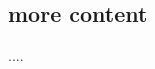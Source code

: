 \documentclass[aps,pre,preprint,nofootinbib]{revtex4}
\begin{document}
\subsection{more content}

....


\begin{acknowledgments}
\end{acknowledgments}


\appendix*
\section{}

%
%
%

%
%
%
%
%
\end{document}
